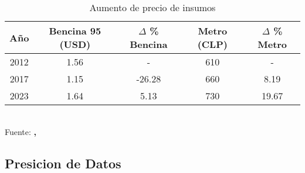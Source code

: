 \documentclass[12pt]{article} %
\begin{document}
\begin{table}[H]
    \centering
    \caption{Aumento de precio de insumos}
    \vspace{0.2cm}
    \begin{tabular}{|c|c|c|c|c|}
        \hline
        Año &  Bencina 95 (USD) & $\Delta$ \% Bencina & Metro (CLP) & $\Delta$ \% Metro\\
        \hline
        2012 &  1.56  & - & 610 & - \\
        2017 &  1.15 & -26.28 & 660 & 8.19\\
        2023 &  1.64 & 5.13 & 730 & 19.67\\
        \hline
    \end{tabular}
    \label{Insumos}
    \vspace{0.2cm}
    \\Fuente: \textbf{\cite{tradingeconomics}, \cite{bcentral}}
\end{table}

\subsection{Presicion de Datos}
\end{document}
